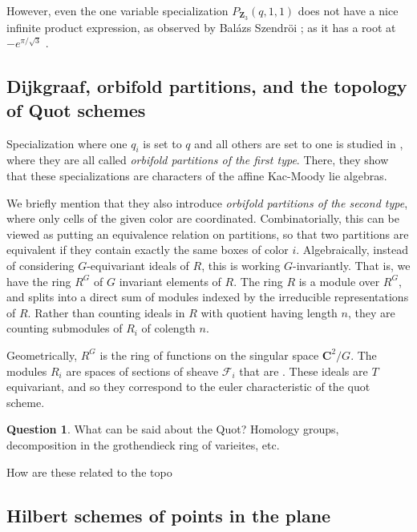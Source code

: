 \documentclass{amsart}[12pt]
\theoremstyle{definition}
\newtheorem{question}{Question}
\newcommand{\Z}{\mathbf{Z}}
\newcommand{\C}{\mathbf{C}}
\begin{document}
However, even the one variable specialization $P_{\Z_3}(q,1,1)$ does not have a nice infinite product expression, as observed by Bal\'azs Szendr\"oi \cite{Bmo}; as it has a root at $-e^{\pi/\sqrt{3}}$ \cite{Borwein2}.

\subsection{Dijkgraaf, orbifold partitions, and the topology of Quot schemes}

Specialization where one $q_i$ is set to $q$ and all others are set to one is studied in \cite{DS}, where they are all called \emph{orbifold partitions of the first type}.  There, they show that these specializations are characters of the affine Kac-Moody lie algebras.

We briefly mention that they also introduce \emph{orbifold partitions of the second type}, where only cells of the given color are coordinated.  Combinatorially, this can be viewed as putting an equivalence relation on partitions, so that two partitions are equivalent if they contain exactly the same boxes of color $i$.  Algebraically, instead of considering $G$-equivariant ideals of $R$, this is working $G$-invariantly.  That is, we have the ring $R^G$ of $G$ invariant elements of $R$.  The ring $R$ is a module over $R^G$, and splits into a direct sum of modules indexed by the irreducible representations of $R$.  Rather than counting ideals in $R$ with quotient having length $n$, they are counting submodules of $R_i$ of colength $n$.  

Geometrically, $R^G$ is the ring of functions on the singular space $\C^2/G$.  The modules $R_i$ are spaces of sections of sheave $\mathcal{F}_i$ that are .  These ideals are $T$ equivariant, and so they correspond to the euler characteristic of the quot scheme.  


\begin{question}
What can be said about the Quot?  Homology groups, decomposition in the grothendieck ring of varieites, etc.

How are these related to the topo

\end{question}



\subsection{Hilbert schemes of points in the plane}
\end{document}

